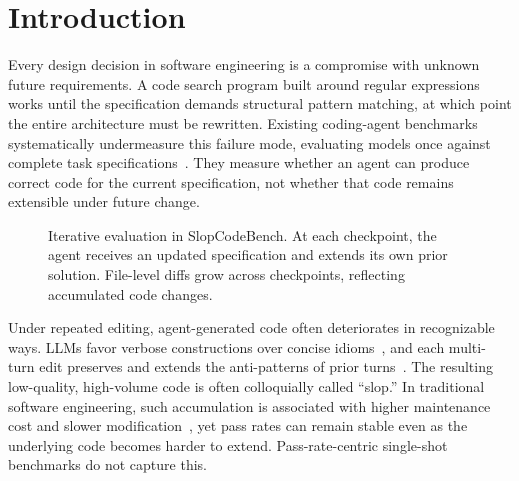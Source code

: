 \section{Introduction}
\label{sec:introduction}

Every design decision in software engineering is a compromise with unknown future requirements. A code search program built around regular expressions works until the specification demands structural pattern matching, at which point the entire architecture must be rewritten. Existing coding-agent benchmarks systematically undermeasure this failure mode, evaluating models once against complete task specifications~\citep{swe-bench,projdevbench,vibe-code-bench,swe-rebench-v2}. They measure whether an agent can produce correct code for the current specification, not whether that code remains extensible under future change.

\begin{figure}[t]
    \centering
    
    \caption{Iterative evaluation in SlopCodeBench. At each checkpoint, the agent receives an updated specification and extends its own prior solution. File-level diffs grow across checkpoints, reflecting accumulated code changes.}
    \label{fig:overview}
\end{figure}

Under repeated editing, agent-generated code often deteriorates in recognizable ways. LLMs favor verbose constructions over concise idioms~\citep{dou2024-whats-wrong-llm-code, abbassi2025-taxonomy-inefficiencies}, and each multi-turn edit preserves and extends the anti-patterns of prior turns~\citep{chen2025-patch-quality, nakashima2026-agentic-prs, what-to-cut}. The resulting low-quality, high-volume code is often colloquially called ``slop.'' In traditional software engineering, such accumulation is associated with higher maintenance cost and slower modification~\citep{lacerda2020-code-smells-tertiary,le2021-architectural-decay,li2022-architecture-erosion}, yet pass rates can remain stable even as the underlying code becomes harder to extend. Pass-rate-centric single-shot benchmarks do not capture this.

